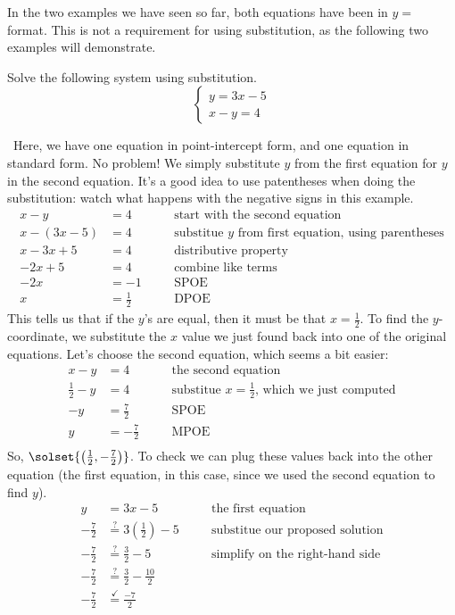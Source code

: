 In the two examples we have seen so far, both equations have been in $y=$ format. This is not a requirement for using substitution, as the following two examples will demonstrate.

\begin{boxex}
Solve the following system using substitution.
\[
\left\{%
\begin{array}{l}
y=3x-5\\
x-y=4
\end{array}
\right.
\] 

\exsoln\ Here, we have one equation in point-intercept form, and one equation in standard form. No problem! We simply substitute $y$ from the first equation for $y$ in the second equation. It's a good idea to use patentheses when doing the substitution: watch what happens with the negative signs in this example.
\[\begin{aligned}
x-y &= 4
&& \quad\text{start with the second equation}\\
x-(3x-5) &= 4
&& \quad\text{substitue $y$ from first equation, using parentheses}\\
x - 3x + 5 &= 4
&& \quad\text{distributive property}\\
-2x + 5 &= 4
&& \quad\text{combine like terms}\\
-2x &= -1
&& \quad\text{SPOE}\\[1ex]
x &= \frac{1}{2}
&& \quad\text{DPOE}
\end{aligned}\]
This tells us that if the $y$'s are equal, then it must be that $x=\frac{1}{2}$. To find the $y$-coordinate, we substitute the $x$ value we just found back into one of the original equations. Let's choose the second equation, which seems a bit easier:
\[\begin{aligned}
x-y &= 4
&& \quad\text{the second equation}\\[1ex]
\frac{1}{2}-y &= 4
&& \quad\text{substitue $x = \tfrac{1}{2}$, which we just computed}\\[1ex]
-y &= \frac{7}{2}
&& \quad\text{SPOE}\\
y &= -\frac{7}{2}
&& \quad\text{MPOE}\\
\end{aligned}\]
So, $\solset{\left(\frac{1}{2}, -\frac{7}{2}\right)}$. To check we can plug these values back into the other equation (the first equation, in this case, since we used the second equation to find $y$).
\[\begin{aligned}
y &= 3x-5
&& \quad\text{the first equation}\\[1ex]
-\frac{7}{2} &\overset{?}{=} 3\left(\frac{1}{2}\right)-5
&& \quad\text{substitue our proposed solution}\\[1ex]
-\frac{7}{2} &\overset{?}{=} \frac{3}{2}-5
&& \quad\text{simplify on the right-hand side}\\[1ex]
-\frac{7}{2} &\overset{?}{=} \frac{3}{2}-\frac{10}{2}
&& \quad\text{}\\[1ex]
-\frac{7}{2} &\overset{\checkmark}{=} \frac{-7}{2}
&& \quad\text{}
\end{aligned}\]
\end{boxex}

